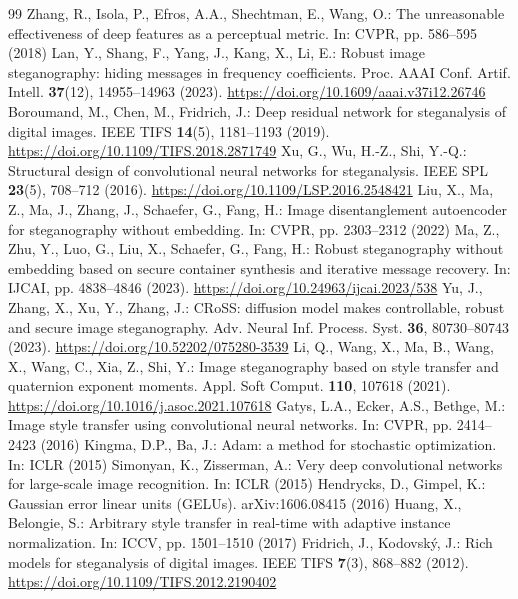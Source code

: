 \documentclass[runningheads]{llncs}
\providecommand{\doi}[1]{\href{https://doi.org/#1}{https://doi.org/#1}}
\begin{document}
\begin{thebibliography}{99}
 Zhang, R., Isola, P., Efros, A.A., Shechtman, E., Wang, O.: The unreasonable effectiveness of deep features as a perceptual metric. In: CVPR, pp. 586--595 (2018)
 Lan, Y., Shang, F., Yang, J., Kang, X., Li, E.: Robust image steganography: hiding messages in frequency coefficients. Proc. AAAI Conf. Artif. Intell. \textbf{37}(12), 14955--14963 (2023). \doi{10.1609/aaai.v37i12.26746}
 Boroumand, M., Chen, M., Fridrich, J.: Deep residual network for steganalysis of digital images. IEEE TIFS \textbf{14}(5), 1181--1193 (2019). \doi{10.1109/TIFS.2018.2871749}
 Xu, G., Wu, H.-Z., Shi, Y.-Q.: Structural design of convolutional neural networks for steganalysis. IEEE SPL \textbf{23}(5), 708--712 (2016). \doi{10.1109/LSP.2016.2548421}
 Liu, X., Ma, Z., Ma, J., Zhang, J., Schaefer, G., Fang, H.: Image disentanglement autoencoder for steganography without embedding. In: CVPR, pp. 2303--2312 (2022)
 Ma, Z., Zhu, Y., Luo, G., Liu, X., Schaefer, G., Fang, H.: Robust steganography without embedding based on secure container synthesis and iterative message recovery. In: IJCAI, pp. 4838--4846 (2023). \doi{10.24963/ijcai.2023/538}
 Yu, J., Zhang, X., Xu, Y., Zhang, J.: CRoSS: diffusion model makes controllable, robust and secure image steganography. Adv. Neural Inf. Process. Syst. \textbf{36}, 80730--80743 (2023). \doi{10.52202/075280-3539}
 Li, Q., Wang, X., Ma, B., Wang, X., Wang, C., Xia, Z., Shi, Y.: Image steganography based on style transfer and quaternion exponent moments. Appl. Soft Comput. \textbf{110}, 107618 (2021). \doi{10.1016/j.asoc.2021.107618}
 Gatys, L.A., Ecker, A.S., Bethge, M.: Image style transfer using convolutional neural networks. In: CVPR, pp. 2414--2423 (2016)
 Kingma, D.P., Ba, J.: Adam: a method for stochastic optimization. In: ICLR (2015)
 Simonyan, K., Zisserman, A.: Very deep convolutional networks for large-scale image recognition. In: ICLR (2015)
 Hendrycks, D., Gimpel, K.: Gaussian error linear units (GELUs). arXiv:1606.08415 (2016)
 Huang, X., Belongie, S.: Arbitrary style transfer in real-time with adaptive instance normalization. In: ICCV, pp. 1501--1510 (2017)
 Fridrich, J., Kodovsk\'y, J.: Rich models for steganalysis of digital images. IEEE TIFS \textbf{7}(3), 868--882 (2012). \doi{10.1109/TIFS.2012.2190402}
\end{thebibliography}
\end{document}
